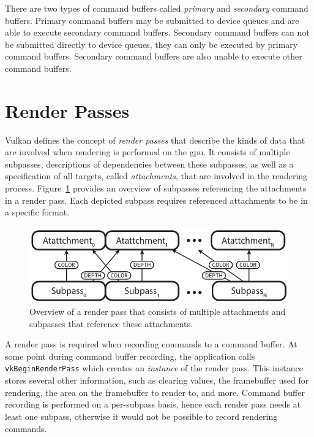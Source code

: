     There are two types of command buffers called \textit{primary} and \textit{secondary} command buffers.
    Primary command buffers may be submitted to device queues and are able to execute secondary command buffers.
    Secondary command buffers can not be submitted directly to device queues, they can only be executed by primary command buffers.
    Secondary command buffers are also unable to execute other command buffers.

  \section{Render Passes}
  \label{sec:RenderPassesOverview}
    Vulkan defines the concept of \textit{render passes} that describe the kinds of data that are involved when rendering is performed on the \gls{gpu}.
    It consists of multiple subpasses, descriptions of dependencies between these subpasses, as well as a specification of all targets, called \textit{attachments}, that are involved in the rendering process.
    \proofread
    Figure~\ref{fig:RenderPassOverview} provides an overview of subpasses referencing the attachments in a render pass.
    Each depicted subpass requires referenced attachments to be in a specific format.

    \begin{figure}
      \centering
      \includegraphics[width=\textwidth]{Main/Images/RenderPassOverview}
      \caption{Overview of a render pass that consists of multiple attachments and subpasses that reference these attachments.}
      \label{fig:RenderPassOverview}
    \end{figure}

    A render pass is required when recording commands to a command buffer.
    At some point during command buffer recording, the application calls \lstinline{vkBeginRenderPass} which creates an \textit{instance} of the render pass.
    This instance stores several other information, such as clearing values, the framebuffer used for rendering, the area on the framebuffer to render to, and more.
    Command buffer recording is performed on a per-subpass basis, hence each render pass needs at least one subpass, otherwise it would not be possible to record rendering commands.

